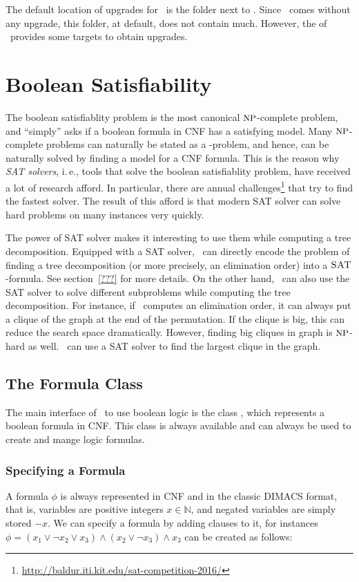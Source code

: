 \documentclass[a4paper, ukenglish, twoside, openright]{jdrasilmanual}
\begin{document}
The default location of upgrades for \Jdrasil\ is the folder
 next to . Since \Jdrasil\ comes
without any upgrade, this folder, at default, does not contain
much. However, the  of \Jdrasil\ provides some targets
to obtain upgrades.

\chapter{Boolean Satisfiability}
The boolean satisfiablity problem  is the most canonical
$\Class{NP}$-complete problem, and ``simply'' asks if a boolean
formula in CNF has a satisfying model. Many $\Class{NP}$-complete
problems can naturally be stated as a -problem, and hence, can
be naturally solved by finding a model for a CNF formula. This is the
reason why \emph{SAT solvers}, i.\,e., tools that solve the boolean
satisfiablity problem, have received a lot of research afford. In
particular, there are annual challenges\footnote{\url{http://baldur.iti.kit.edu/sat-competition-2016/}} that try to
find the fastest solver. The result of this afford is that modern
SAT solver can solve hard problems on many instances very quickly.

The power of SAT solver makes it interesting to use them while
computing a tree decomposition. Equipped with a SAT solver, \Jdrasil\
can directly encode the problem of finding a tree decomposition (or
more precisely, an elimination order) into a $\Lang{SAT}$-formula. See
section~\ref{???} for more details. On the other hand, \Jdrasil\ can
also use the SAT solver to solve different subproblems while computing
the tree decomposition. For instance, if \Jdrasil\ computes an
elimination order, it can always put a clique of the graph at the
end of the permutation. If the clique is big, this can reduce the
search space dramatically. However, finding big cliques in graph is
$\Class{NP}$-hard as well. \Jdrasil\ can use a SAT solver to find the
largest clique in the graph.

\section{The Formula Class}\label{section:satFormula}
The main interface of \Jdrasil\ to use boolean logic is the class
\JClass{jdrasil.sat.Formula}, which represents a boolean formula in
CNF. This class is always available and can always be used to create
and mange logic formulas. 

\subsection{Specifying a Formula}
A formula $\phi$ is always represented in CNF and in the classic
DIMACS format, that is, variables are positive integers
$x\in\mathbb{N}$, and negated variables are simply stored $-x$. We
can specify a formula by adding clauses to it, for instances
$\phi=(x_1\vee\neg x_2\vee x_3)\wedge(x_2\vee\neg x_3)\wedge x_3$ can
be created as follows:
\end{document}
